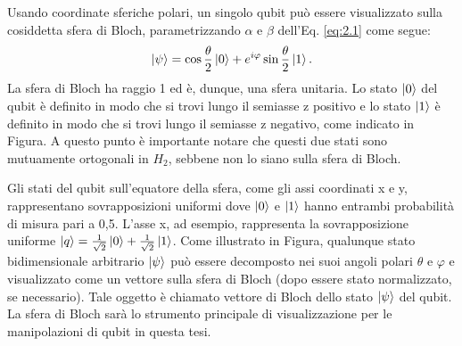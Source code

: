 Usando coordinate sferiche polari, un singolo qubit può essere visualizzato sulla cosiddetta sfera 
di Bloch, parametrizzando $\alpha$ e $\beta$ dell'Eq. \ref{eq:2.1} come segue: 
\begin{equation}
    \ket{\psi} = \cos\frac{\theta}{2}\ket{0} + e^{i\varphi}\sin\frac{\theta}{2}\ket{1}.
\end{equation}
La sfera di Bloch ha raggio 1 ed è, dunque, una sfera unitaria. 
Lo stato $\ket{0}$ del qubit è definito in modo che si trovi lungo il semiasse z positivo e lo 
stato $\ket{1}$ è definito in modo che si trovi lungo il semiasse z negativo, come indicato in 
Figura. %
A questo punto è importante notare che questi due stati sono mutuamente ortogonali in $H_2$, 
sebbene non lo siano sulla sfera di Bloch. 

Gli stati del qubit sull'equatore della sfera, come gli assi coordinati x e y, rappresentano 
sovrapposizioni uniformi dove $\ket{0}$ e $\ket{1}$ hanno entrambi probabilità di misura pari a 
0,5. L'asse x, ad esempio, rappresenta la sovrapposizione uniforme $\ket{q} = \frac{1}{\sqrt{2}}
\ket{0} + \frac{1}{\sqrt{2}}\ket{1}$. Come illustrato in Figura, %
qualunque stato bidimensionale arbitrario $\ket{\psi}$ può essere decomposto nei suoi angoli 
polari $\theta$ e $\varphi$ e visualizzato come un vettore sulla sfera di Bloch (dopo essere 
stato normalizzato, se necessario). Tale oggetto è chiamato vettore di Bloch dello stato 
$\ket{\psi}$ del qubit. La sfera di Bloch sarà lo strumento principale di visualizzazione per le 
manipolazioni di qubit in questa tesi. 



